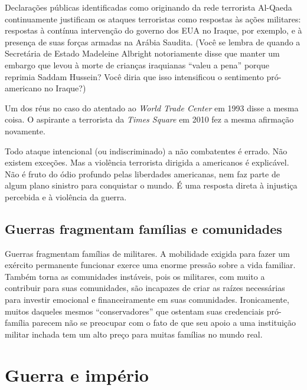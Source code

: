 Declarações públicas identificadas como originando da rede terrorista Al-Qaeda continuamente justificam os ataques terroristas como respostas às ações militares: respostas à contínua intervenção do governo dos EUA no Iraque, por exemplo, e à presença de suas forças armadas na Arábia Saudita. (Você se lembra de quando a Secretária de Estado Madeleine Albright notoriamente disse que manter um embargo que levou à morte de crianças iraquianas ``valeu a pena'' porque reprimia Saddam Hussein? Você diria que isso intensificou o sentimento pró-americano no Iraque?)

Um dos réus no caso do atentado ao \emph{World Trade Center} em 1993 disse a mesma coisa. O aspirante a terrorista da \emph{Times Square} em 2010 fez a mesma afirmação novamente.

Todo ataque intencional (ou indiscriminado) a não combatentes é errado. Não existem exceções. Mas a violência terrorista dirigida a americanos é explicável. Não é fruto do ódio profundo pelas liberdades americanas, nem faz parte de algum plano sinistro para conquistar o mundo. É uma resposta direta à injustiça percebida e à violência da guerra.

\subsection*{Guerras fragmentam famílias e comunidades}

Guerras fragmentam famílias de militares. A mobilidade exigida para fazer um exército permanente funcionar exerce uma enorme pressão sobre a vida familiar. Também torna as comunidades instáveis, pois os militares, com muito a contribuir para suas comunidades, são incapazes de criar as raízes necessárias para investir emocional e financeiramente em suas comunidades. Ironicamente, muitos daqueles mesmos ``conservadores'' que ostentam suas credenciais pró-família parecem não se preocupar com o fato de que seu apoio a uma instituição militar inchada tem um alto preço para muitas famílias no mundo real.

\section{Guerra e império}

